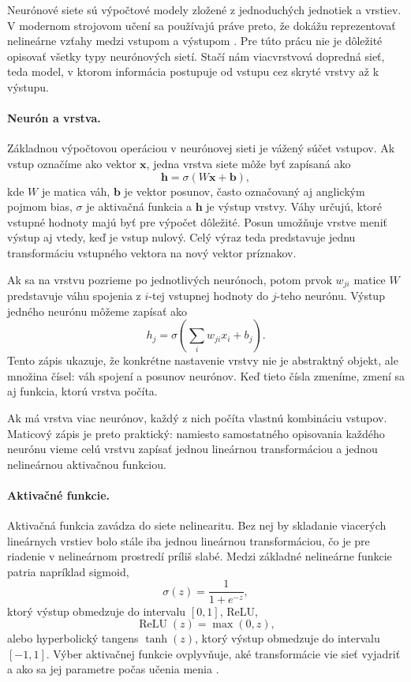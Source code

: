 Neurónové siete sú výpočtové modely zložené z jednoduchých jednotiek a vrstiev. V modernom strojovom učení sa používajú práve preto, že dokážu reprezentovať nelineárne vzťahy medzi vstupom a výstupom \cite{goodfellow2016deep}. Pre túto prácu nie je dôležité opisovať všetky typy neurónových sietí. Stačí nám viacvrstvová dopredná sieť, teda model, v ktorom informácia postupuje od vstupu cez skryté vrstvy až k výstupu.

\paragraph{Neurón a vrstva.}
Základnou výpočtovou operáciou v neurónovej sieti je vážený súčet vstupov. Ak vstup označíme ako vektor $\mathbf{x}$, jedna vrstva siete môže byť zapísaná ako
\[
    \mathbf{h} = \sigma(W\mathbf{x} + \mathbf{b}),
\]
kde $W$ je matica váh, $\mathbf{b}$ je vektor posunov, často označovaný aj anglickým pojmom bias, $\sigma$ je aktivačná funkcia a $\mathbf{h}$ je výstup vrstvy. Váhy určujú, ktoré vstupné hodnoty majú byť pre výpočet dôležité. Posun umožňuje vrstve meniť výstup aj vtedy, keď je vstup nulový. Celý výraz teda predstavuje jednu transformáciu vstupného vektora na nový vektor príznakov.

Ak sa na vrstvu pozrieme po jednotlivých neurónoch, potom prvok $w_{ji}$ matice $W$ predstavuje váhu spojenia z $i$-tej vstupnej hodnoty do $j$-teho neurónu. Výstup jedného neurónu môžeme zapísať ako
\[
    h_j = \sigma\left(\sum_i w_{ji} x_i + b_j\right).
\]
Tento zápis ukazuje, že konkrétne nastavenie vrstvy nie je abstraktný objekt, ale množina čísel: váh spojení a posunov neurónov. Keď tieto čísla zmeníme, zmení sa aj funkcia, ktorú vrstva počíta.

Ak má vrstva viac neurónov, každý z nich počíta vlastnú kombináciu vstupov. Maticový zápis je preto praktický: namiesto samostatného opisovania každého neurónu vieme celú vrstvu zapísať jednou lineárnou transformáciou a jednou nelineárnou aktivačnou funkciou.

\paragraph{Aktivačné funkcie.}
Aktivačná funkcia zavádza do siete nelinearitu. Bez nej by skladanie viacerých lineárnych vrstiev bolo stále iba jednou lineárnou transformáciou, čo je pre riadenie v nelineárnom prostredí príliš slabé. Medzi základné nelineárne funkcie patria napríklad sigmoid,
\[
    \sigma(z) = \frac{1}{1 + e^{-z}},
\]
ktorý výstup obmedzuje do intervalu $[0,1]$, ReLU,
\[
    \operatorname{ReLU}(z) = \max(0, z),
\]
alebo hyperbolický tangens $\tanh(z)$, ktorý výstup obmedzuje do intervalu $[-1, 1]$. Výber aktivačnej funkcie ovplyvňuje, aké transformácie vie sieť vyjadriť a ako sa jej parametre počas učenia menia \cite{goodfellow2016deep}.

